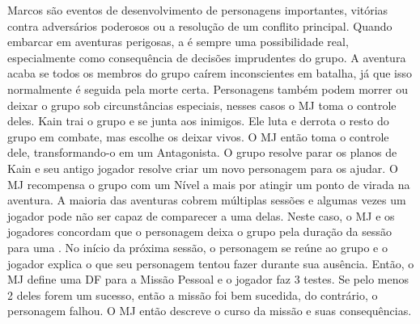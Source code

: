 Marcos são eventos de desenvolvimento de personagens importantes, vitórias contra adversários poderosos ou a resolução de um conflito principal. 
Quando embarcar em aventuras perigosas, a  é sempre uma possibilidade real, especialmente como consequência de decisões imprudentes do grupo. 
A aventura acaba se todos os membros do grupo caírem inconscientes em batalha, já que isso normalmente é seguida pela morte certa. 
Personagens também podem morrer ou deixar o grupo sob circunstâncias especiais, nesses casos o MJ toma o controle deles.
%
\ofpar
%
{
	Kain trai o grupo e se junta aos inimigos. 
	Ele luta e derrota o resto do grupo em combate, mas escolhe os deixar vivos. 
	O MJ então toma o controle dele, transformando-o em um Antagonista. 
	O grupo resolve parar os planos de Kain e seu antigo jogador resolve criar um novo personagem para os ajudar. 
	O MJ recompensa o grupo com um Nível a mais por atingir um ponto de virada na aventura.
}
%
\vfill
%
A maioria das aventuras cobrem múltiplas sessões e algumas vezes um jogador pode não ser capaz de comparecer a uma delas. 
Neste caso, o MJ e os jogadores concordam que o personagem deixa o grupo pela duração da sessão para uma .
No início da próxima sessão, o personagem se reúne ao grupo e o jogador explica o que seu personagem tentou fazer durante sua ausência. 
Então, o MJ define uma DF para a Missão Pessoal e o jogador faz 3 testes. 
Se pelo menos 2 deles forem um sucesso, então a missão foi bem sucedida, do contrário, o personagem falhou. O MJ então descreve o curso da missão e suas consequências.
%
\clearpage
